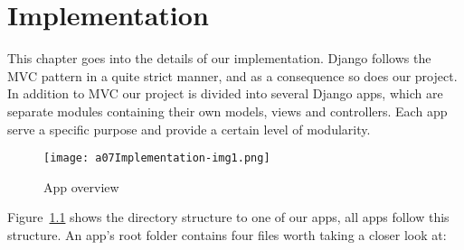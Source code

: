 \chapter{Implementation}\label{chapter:implementation}
This chapter goes into the details of our implementation. 
Django follows the MVC pattern in a quite strict
manner, and as a consequence so does our project. In addition to MVC
our project is divided into several Django apps, which are separate
modules containing their own models, views and controllers. 
Each app serve a specific purpose and provide a certain level of
modularity. 

\begin{figure}
	\texttt{[image: a07Implementation-img1.png]}
	\caption{App overview}
	\label{fig:appOverview}
\end{figure}

Figure~\ref{fig:appOverview} shows the directory structure to one of our apps,
all apps follow this structure. An app's root folder contains four files worth
taking a closer look at:

